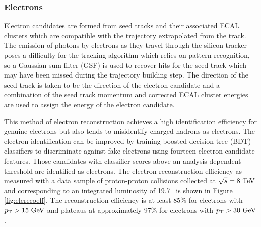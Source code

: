 \subsubsection{Electrons}

Electron candidates are formed from seed tracks and their associated ECAL clusters which are compatible with the trajectory extrapolated from the track. The emission of photons by electrons as they travel through the silicon tracker poses a difficulty for the tracking algorithm which relies on pattern recognition, so a Gaussian-sum filter (GSF)\cite{GSFTRACK} is used to recover hits for the seed track which may have been missed during the trajectory building step. The direction of the seed track is taken to be the direction of the electron candidate and a combination of the seed track momentum and corrected ECAL cluster energies are used to assign the energy of the electron candidate.

This method of electron reconstruction achieves a high identification efficiency for genuine electrons but also tends to misidentify charged hadrons as electrons. The electron identification can be improved by training boosted decision tree (BDT) classifiers to discriminate against fake electrons using fourteen electron candidate features.\cite{CMSELEPERF} Those candidates with classifier scores above an analysis-dependent threshold are identified as electrons. The electron reconstruction efficiency as measured with a data sample of proton-proton collisions collected at $\sqrt{s} = 8\ \mathrm{TeV}$ and corresponding to an integrated luminosity of 19.7 \invfb\ is shown in Figure \ref{fig:elerecoeff}. The reconstruction efficiency is at least 85\% for electrons with $p_{\mathrm{T}} > 15\ \mathrm{GeV}$ and plateaus at approximately 97\% for electrons with $p_{\mathrm{T}} > 30\ \mathrm{GeV}$.

